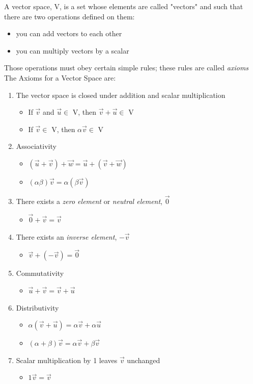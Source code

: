 \documentclass[a4paper, 11pt, normalem]{report}
\begin{document}
A vector space, V, is a set whose elements are called "vectors" and such that there are two operations defined on them:
\begin{itemize}
    \item you can add vectors to each other
    \item you can multiply vectors by a scalar
\end{itemize}
Those operations must obey certain simple rules; these rules are called \emph{axioms} \\
The Axioms for a Vector Space are:
\begin{enumerate}
    \item The vector space is closed under addition and scalar multiplication
        \begin{itemize}
            \item If $\vec{v}$ and $\vec{u} \in$ V, then $\vec{v} + \vec{u} \in$ V
            \item If $\vec{v} \in$ V, then $\alpha\vec{v} \in$ V
        \end{itemize}
    \item Associativity
        \begin{itemize}
            \item $(\vec{u} + \vec{v}) + \vec{w} = \vec{u} + (\vec{v} + \vec{w})$
            \item $(\alpha\beta)\vec{v} = \alpha(\beta\vec{v})$
        \end{itemize}
    \item There exists a \emph{zero element} or \emph{neutral element}, $\vec{0}$
        \begin{itemize}
            \item $\vec{0} + \vec{v} = \vec{v}$
        \end{itemize}
    \item There exists an \emph{inverse element}, $-\vec{v}$
        \begin{itemize}
            \item $\vec{v} + (-\vec{v}) = \vec{0}$
        \end{itemize}
    \item Commutativity
        \begin{itemize}
            \item $\vec{u} + \vec{v} = \vec{v} + \vec{u}$
        \end{itemize}
    \item Distributivity
        \begin{itemize}
            \item $\alpha(\vec{v} + \vec{u}) = \alpha\vec{v} + \alpha\vec{u}$
            \item $(\alpha + \beta)\vec{v} = \alpha\vec{v} + \beta\vec{v}$
        \end{itemize}
    \item Scalar multiplication by 1 leaves $\vec{v}$ unchanged
        \begin{itemize}
            \item $1\vec{v} = \vec{v}$
        \end{itemize}
\end{enumerate}
\end{document}
